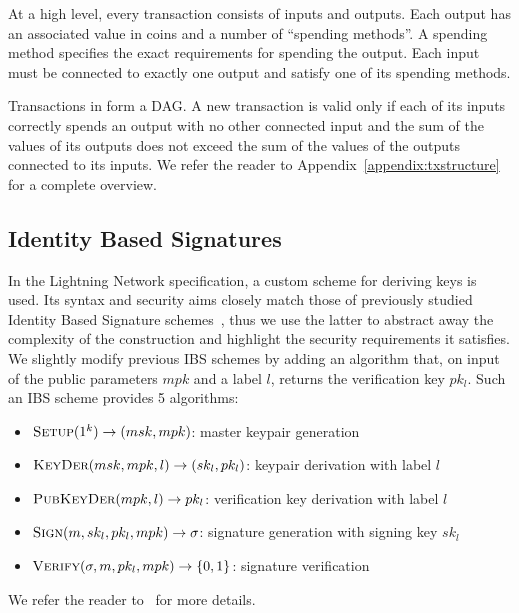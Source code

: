     At a high level, every transaction consists of inputs and outputs. Each
    output has an associated value in coins and a number of ``spending
    methods''. A spending method specifies the exact requirements for spending
    the output. Each input must be connected to exactly one output and satisfy
    one of its spending methods.

    Transactions in \ledger{} form a DAG. A new transaction is valid only if
    each of its inputs correctly spends an output with no other connected input
    and the sum of the values of its outputs does not exceed the sum of the
    values of the outputs connected to its inputs. We refer the reader to
    Appendix~\ref{appendix:txstructure} for a complete overview.

  \subsection{Identity Based Signatures}
    In the Lightning Network specification, a custom scheme for deriving keys is
    used. Its syntax and security aims closely match those of previously studied
    Identity Based Signature schemes~\cite{ibsshamir,ibspaterson}, thus we use
    the latter to abstract away the complexity of the construction and highlight
    the security requirements it satisfies. We slightly modify previous IBS
    schemes by adding an algorithm that, on input of the public parameters $mpk$
    and a label $l$, returns the verification key $pk_l$. Such an IBS scheme
    provides 5 algorithms:
    \begin{itemize}
      \item $\textsc{Setup}(1^k) \rightarrow (msk, mpk)$: master keypair
      generation
      \item $\textsc{KeyDer}(msk, mpk, l) \rightarrow (sk_l, pk_l)$: keypair
      derivation with label $l$
      \item $\textsc{PubKeyDer}(mpk, l) \rightarrow pk_l$: verification key
      derivation with label $l$
      \item $\textsc{Sign}(m, sk_l, pk_l, mpk) \rightarrow \sigma$: signature
      generation with signing key $sk_l$
      \item $\textsc{Verify}(\sigma, m, pk_l, mpk) \rightarrow \{0, 1\}$:
      signature verification
    \end{itemize}
    We refer the reader to~\cite{ibspaterson} for more details.  
